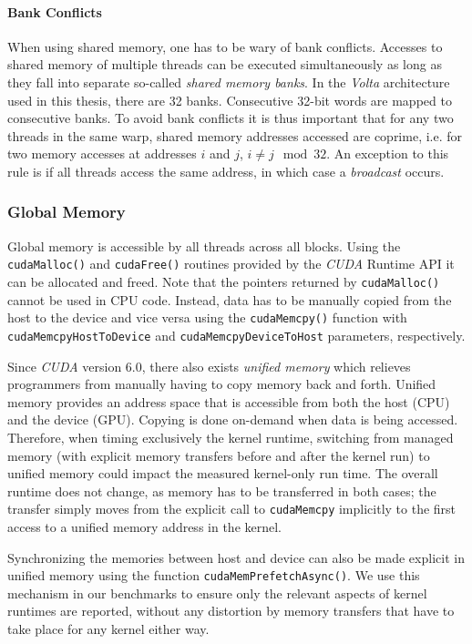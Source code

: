 \paragraph{Bank Conflicts} \label{sec:bank-conflicts}
When using shared memory, one has to be wary of bank conflicts. Accesses to shared memory of multiple threads can be executed simultaneously as long as they fall into separate so-called \emph{shared memory banks}. In the \emph{Volta} architecture used in this thesis, there are 32 banks. Consecutive 32-bit words are mapped to consecutive banks. To avoid bank conflicts it is thus important that for any two threads in the same warp, shared memory addresses accessed are coprime, i.e. for two memory accesses at addresses $i$ and $j$, $i \neq j \mod 32$. An exception to this rule is if all threads access the same address, in which case a \emph{broadcast} occurs.

\subsubsection{Global Memory}    \label{sec:unified-memory}
Global memory is accessible by all threads across all blocks. Using the \texttt{cudaMalloc()} and \texttt{cudaFree()} routines provided by the \emph{CUDA} Runtime API it can be allocated and freed. Note that the pointers returned by \texttt{cudaMalloc()} cannot be used in CPU code. Instead, data has to be manually copied from the host to the device and vice versa using the \texttt{cudaMemcpy()} function with \texttt{cudaMemcpyHostToDevice} and \texttt{cudaMemcpyDeviceToHost} parameters, respectively. 

Since \emph{CUDA} version 6.0, there also exists \emph{unified memory} which relieves programmers from manually having to copy memory back and forth. Unified memory provides an address space that is accessible from both the host (CPU) and the device (GPU). Copying is done on-demand when data is being accessed. Therefore, when timing exclusively the kernel runtime, switching from managed memory (with explicit memory transfers before and after the kernel run) to unified memory could impact the measured kernel-only run time. The overall runtime does not change, as memory has to be transferred in both cases; the transfer simply moves from the explicit call to \texttt{cudaMemcpy} implicitly to the first access to a unified memory address in the kernel.

Synchronizing the memories between host and device can also be made explicit in unified memory using the function \texttt{cudaMemPrefetchAsync()}. We use this mechanism in our benchmarks to ensure only the relevant aspects of kernel runtimes are reported, without any distortion by memory transfers that have to take place for any kernel either way.

